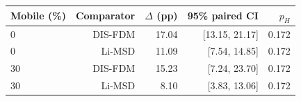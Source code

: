 \begin{tabular}{@{}lrrrr@{}}
\toprule
Mobile (\%) & Comparator & $\Delta$ (pp) & 95\% paired CI & $p_H$ \\
\midrule
0 & DIS-FDM & 17.04 & [13.15, 21.17] & 0.172 \\
0 & Li-MSD & 11.09 & [7.54, 14.85] & 0.172 \\
30 & DIS-FDM & 15.23 & [7.24, 23.70] & 0.172 \\
30 & Li-MSD & 8.10 & [3.83, 13.06] & 0.172 \\
\bottomrule
\end{tabular}
